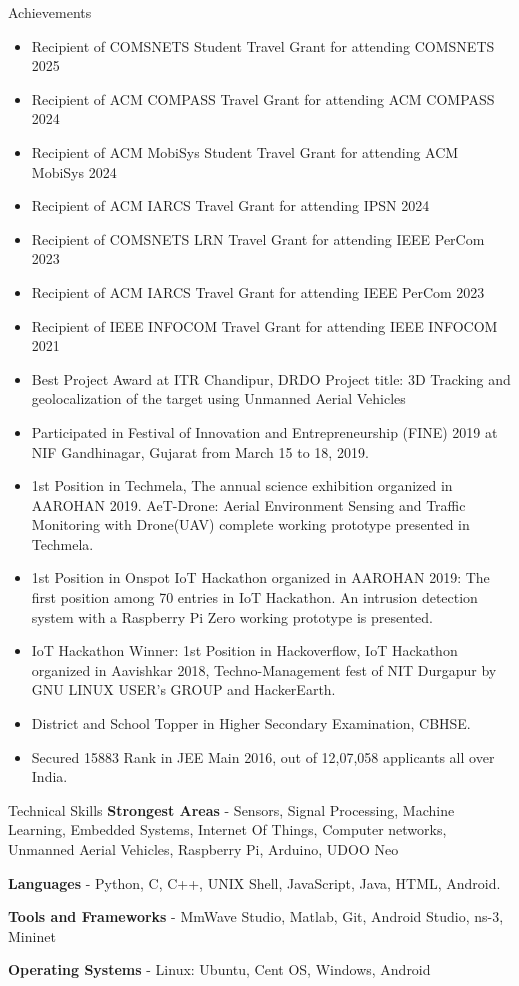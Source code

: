 \documentclass{resume} %
\begin{document}
	\begin{rSection}{Achievements} 
		\begin{itemize}
			\item Recipient of COMSNETS Student Travel Grant for attending COMSNETS 2025
			\item Recipient of ACM COMPASS Travel Grant for attending ACM COMPASS 2024
			\item Recipient of ACM MobiSys Student Travel Grant for attending ACM MobiSys 2024
			\item Recipient of ACM IARCS Travel Grant for attending IPSN 2024
			\item Recipient of COMSNETS LRN Travel Grant for attending IEEE PerCom 2023
			\item Recipient of ACM IARCS Travel Grant for attending IEEE PerCom 2023
			\item Recipient of IEEE INFOCOM Travel Grant for attending IEEE INFOCOM 2021
			\item Best Project Award at ITR Chandipur, DRDO Project title: 3D Tracking and geolocalization of the target using Unmanned Aerial Vehicles
			\item Participated in Festival of Innovation and Entrepreneurship (FINE) 2019 at NIF Gandhinagar, Gujarat from March 15 to 18, 2019.
			\item 1st Position in Techmela, The annual science exhibition organized in AAROHAN 2019. AeT-Drone: Aerial Environment Sensing and Traffic Monitoring with Drone(UAV) complete working prototype presented in Techmela.
			\item 1st Position in Onspot IoT Hackathon organized in AAROHAN 2019: The first position among 70 entries in IoT Hackathon. An intrusion detection system with a Raspberry Pi Zero working prototype is presented.
			\item IoT Hackathon Winner: 1st Position in Hackoverflow, IoT Hackathon organized in Aavishkar 2018, Techno-Management fest of NIT Durgapur by GNU LINUX USER's GROUP and HackerEarth.
			\item District and School Topper in Higher Secondary Examination, CBHSE.
			\item Secured 15883 Rank in JEE Main 2016, out of 12,07,058
			applicants all over India.
		\end{itemize}
	\end{rSection}
	\newpage
	\begin{rSection}{Technical Skills}
		\textbf{Strongest Areas} - Sensors, Signal Processing, Machine Learning, Embedded Systems, Internet Of Things, Computer networks, Unmanned Aerial Vehicles, Raspberry Pi, Arduino, UDOO Neo
		
		\textbf{Languages} - Python, C, C++, UNIX Shell, JavaScript, Java, HTML, Android.
		
		\textbf{Tools and Frameworks} - MmWave Studio, Matlab, Git, Android Studio, ns-3, Mininet
		
		\textbf{Operating Systems} - Linux: Ubuntu, Cent OS, Windows, Android\\
	\end{rSection}
	
\end{document}
